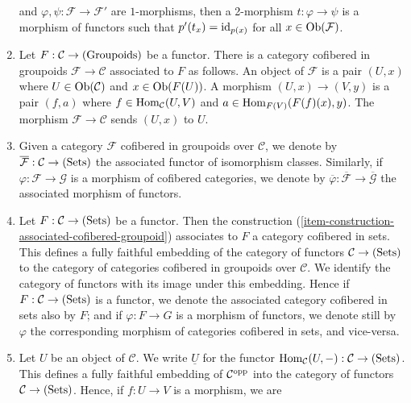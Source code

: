 \begin{remarks}
\begin{enumerate}
and $\varphi, \psi: \mathcal F \rightarrow \mathcal F'$ are $1$-morphisms, then 
a 2-morphism $t: \varphi \rightarrow \psi$ is a morphism of functors such that 
$p'(t_x) = \textnormal{id}_{p(x)}$ for all $x \in \textnormal{Ob}(\mathcal F)$.
\item
\label{item-construction-associated-cofibered-groupoid} 
Let $F: \mathcal C \rightarrow \textnormal{(Groupoids)}$ be a functor.  There 
is a category cofibered in groupoids $\mathcal F \rightarrow \mathcal C$ 
associated to $F$ as follows.  An object of $\mathcal F$ is a pair $(U,x)$ 
where $U \in \textnormal{Ob}(\mathcal C)$ and $x \in \textnormal{Ob}(F(U))$.  A 
morphism $(U,x) \rightarrow (V,y)$ is a pair $(f,a)$ where $f \in 
\textnormal{Hom}_{\mathcal C}(U,V)$ and $a \in 
\textnormal{Hom}_{F(V)}(F(f)(x),y)$.  The morphism $\mathcal F \rightarrow 
\mathcal C$ sends $(U,x)$ to $U$.
\item Given a category $\mathcal F$ cofibered in groupoids over $\mathcal C$, 
we denote by $\overline{\mathcal{F}} : \mathcal C \rightarrow 
\textnormal{(Sets)}$ the associated functor of isomorphism classes. Similarly, 
if $\varphi: \mathcal F \rightarrow \mathcal G$ is a morphism of cofibered 
categories, we denote by $\overline{\varphi}: \overline{\mathcal F} \rightarrow 
\overline{\mathcal G}$ the associated morphism of functors.
\item 
\label{item-convention-cofibered-sets}
Let $F: \mathcal C \rightarrow \textnormal{(Sets)}$ be a functor.  Then the 
construction (\ref{item-construction-associated-cofibered-groupoid})
associates to 
$F$ a category cofibered in sets. This defines a fully faithful embedding of 
the category of functors $\mathcal C \rightarrow \textnormal{(Sets)}$ to the 
category of categories cofibered in groupoids over $\mathcal C$. We identify 
the category of functors with its image under this embedding. Hence if $F: 
\mathcal C \rightarrow \textnormal{(Sets)}$ is a functor, we denote the 
associated category cofibered in sets also by $F$; and if $\varphi: F 
\rightarrow G$ is a morphism of functors, we denote still by $\varphi$ the 
corresponding morphism of categories cofibered in sets, and vice-versa.
\item 
\label{definition-yoneda}
Let $U$ be an object of $\mathcal C$.  We write $\underline{U}$ for the functor 
$\textnormal{Hom}_{\mathcal C}(U,-): \mathcal C \rightarrow 
\textnormal{(Sets)}$.  This defines a fully faithful embedding of $\mathcal 
C^{\textnormal{opp}}$ into the category of functors $\mathcal C \rightarrow 
\textnormal{(Sets)}$. Hence, if $f: U \rightarrow V$ is a morphism, we are 

\end{enumerate}
\end{remarks}
